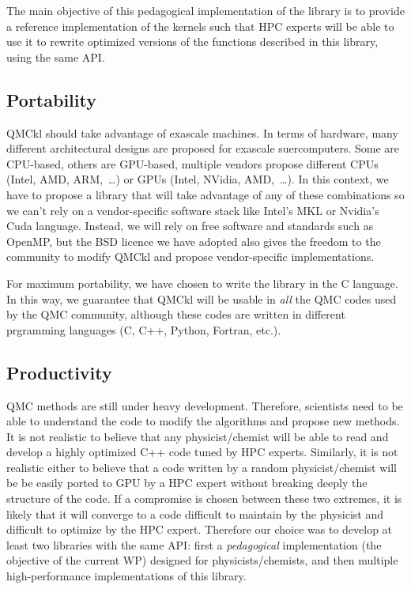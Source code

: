 The main objective of this pedagogical implementation of the library
is to provide a reference implementation of the kernels such that
\ac{HPC} experts will be able to use it to rewrite optimized versions
of the functions described in this library, using the same \ac{API}.

\subsection{Portability}

\ac{QMCkl} should take advantage of exascale machines. In terms of hardware,
many different architectural designs are proposed for exascale
suercomputers. Some are CPU-based, others are GPU-based, multiple vendors
propose different CPUs (Intel, AMD, ARM,~\dots) or GPUs (Intel,
NVidia, AMD,~\dots). In this context, we have to propose a library that
will take advantage of any of these combinations so we can't rely on 
a vendor-specific software stack like Intel's \ac{MKL} or Nvidia's
Cuda language. Instead, we
will rely on free software and standards such as OpenMP, but the BSD
licence we have adopted also gives the freedom to the community to
modify \ac{QMCkl} and propose vendor-specific implementations.

For maximum portability, we have chosen to write the library in the C
language. In this way, we guarantee that \ac{QMCkl} will be usable in
\emph{all} the QMC codes used by the \ac{QMC} community, although these
codes are written in different prgramming languages (C, C++, Python,
Fortran, etc.).

\subsection{Productivity}

\ac{QMC} methods are still under heavy development. Therefore,
scientists need to be able to understand the code to modify the
algorithms and propose new methods. It is not realistic to believe
that any physicist/chemist will be able to read and develop a highly optimized
C++ code tuned by HPC experts. Similarly, it is not realistic
either to believe that a code written by a random physicist/chemist will
be be easily ported to GPU by a HPC expert without breaking deeply the
structure of the code. If a compromise
is chosen between these two extremes, it is likely that it will
converge to a code difficult to maintain by the physicist and
difficult to optimize by the HPC expert. Therefore our choice was to
develop at least two libraries with the same \ac{API}: first a
\emph{pedagogical} implementation (the objective of the current \ac{WP})
designed for physicists/chemists, and then multiple high-performance
implementations of this library.

